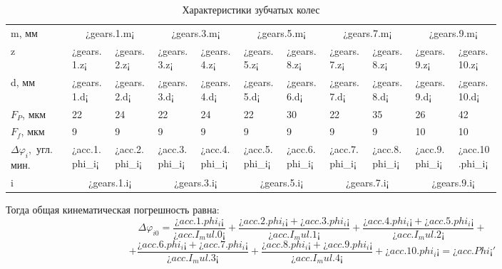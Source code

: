 \documentclass[14pt,a4paper,russian]{scrartcl}
\begin{document}
        \begin{table}[h!]
            \begin{center}
                \begin{tabular}{p{0.1\linewidth}|p{0.07\linewidth}p{0.07\linewidth}p{0.07\linewidth}p{0.07\linewidth}p{0.07\linewidth}p{0.07\linewidth}p{0.07\linewidth}p{0.07\linewidth}p{0.07\linewidth}p{0.07\linewidth}}
                    \hline
                    m, мм  & \multicolumn{2}{c}{¿gears.1.m¡} & \multicolumn{2}{c}{¿gears.3.m¡} & \multicolumn{2}{c}{¿gears.5.m¡} & \multicolumn{2}{c}{¿gears.7.m¡} & \multicolumn{2}{c}{¿gears.9.m¡} \\
                    z       & ¿gears.1.z¡ &  ¿gears.2.z¡ &  ¿gears.3.z¡ &  ¿gears.4.z¡ &  ¿gears.5.z¡ & ¿gears.8.z¡ &   ¿gears.7.z¡ &  ¿gears.8.z¡ &  ¿gears.9.z¡ &  ¿gears.10.z¡ \\
                    d, мм   & ¿gears.1.d¡ &  ¿gears.2.d¡ &  ¿gears.3.d¡ &  ¿gears.4.d¡ &  ¿gears.5.d¡ & ¿gears.6.d¡ &   ¿gears.7.d¡ &  ¿gears.8.d¡ &  ¿gears.9.d¡ &  ¿gears.10.d¡ \\
                    \( F_P \), мкм & 22 & 24 & 22 & 24 & 22 & 30 & 22 & 35 & 26 & 42 \\
                    \( F_f \), мкм & 9 & 9 & 9 & 9 & 9 & 9 & 9 & 9 & 10 & 10 \\
                    \( \Delta\varphi_{i},  \) угл. мин. & ¿acc.1.phi_i¡ & ¿acc.2.phi_i¡ & ¿acc.3.phi_i¡ & ¿acc.4.phi_i¡ & ¿acc.5.phi_i¡ & ¿acc.6.phi_i¡ & ¿acc.7.phi_i¡ & ¿acc.8.phi_i¡ & ¿acc.9.phi_i¡ & ¿acc.10.phi_i¡ \\
                    i  & \multicolumn{2}{c}{¿gears.1.i¡} & \multicolumn{2}{c}{¿gears.3.i¡} & \multicolumn{2}{c}{¿gears.5.i¡} & \multicolumn{2}{c}{¿gears.7.i¡} & \multicolumn{2}{c}{¿gears.9.i¡} \\
                    \hline
                \end{tabular}
                \caption{{Характеристики зубчатых колес}}\label{tab:gears_digest}
            \end{center}
        \end{table}

        Тогда общая кинематическая погрешность равна:
        \[ \Delta\varphi_{i0} = 
                \frac{¿acc.1.phi_i¡}{¿acc.I_mul.0¡}
                + \frac{¿acc.2.phi_i¡+¿acc.3.phi_i¡}{¿acc.I_mul.1¡}
                + \frac{¿acc.4.phi_i¡+¿acc.5.phi_i¡}{¿acc.I_mul.2¡}+\]
              \[+ \frac{¿acc.6.phi_i¡+¿acc.7.phi_i¡}{¿acc.I_mul.3¡}
                + \frac{¿acc.8.phi_i¡+¿acc.9.phi_i¡}{¿acc.I_mul.4¡}
                + ¿acc.10.phi_i¡ = ¿acc.Phi¡'\]
        
\end{document}
